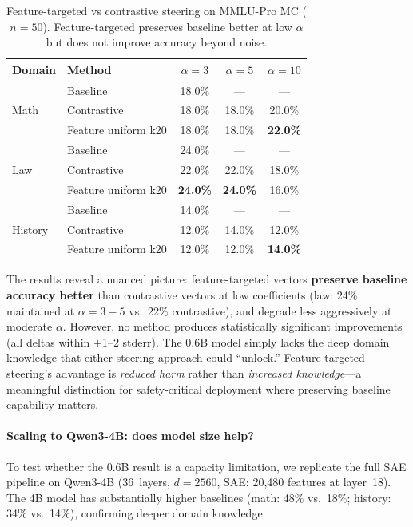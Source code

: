 \documentclass[11pt,a4paper]{article}
\begin{document}
\begin{table}[H]
\centering
\caption{Feature-targeted vs contrastive steering on MMLU-Pro MC ($n=50$). Feature-targeted preserves baseline better at low $\alpha$ but does not improve accuracy beyond noise.}
\label{tab:feature_targeted}
\small
\begin{tabular}{llccc}
\toprule
\textbf{Domain} & \textbf{Method} & $\alpha=3$ & $\alpha=5$ & $\alpha=10$ \\
\midrule
\multirow{3}{*}{Math}
  & Baseline          & 18.0\% & --- & --- \\
  & Contrastive       & 18.0\% & 18.0\% & 20.0\% \\
  & Feature uniform k20 & 18.0\% & 18.0\% & \textbf{22.0\%} \\
\midrule
\multirow{3}{*}{Law}
  & Baseline          & 24.0\% & --- & --- \\
  & Contrastive       & 22.0\% & 22.0\% & 18.0\% \\
  & Feature uniform k20 & \textbf{24.0\%} & \textbf{24.0\%} & 16.0\% \\
\midrule
\multirow{3}{*}{History}
  & Baseline          & 14.0\% & --- & --- \\
  & Contrastive       & 12.0\% & 14.0\% & 12.0\% \\
  & Feature uniform k20 & 12.0\% & 12.0\% & \textbf{14.0\%} \\
\bottomrule
\end{tabular}
\end{table}

The results reveal a nuanced picture: feature-targeted vectors \textbf{preserve baseline accuracy better} than contrastive vectors at low coefficients (law: 24\% maintained at $\alpha=3{-}5$ vs.\ 22\% contrastive), and degrade less aggressively at moderate $\alpha$. However, no method produces statistically significant improvements (all deltas within $\pm$1--2 stderr). The 0.6B model simply lacks the deep domain knowledge that either steering approach could ``unlock.'' Feature-targeted steering's advantage is \textit{reduced harm} rather than \textit{increased knowledge}---a meaningful distinction for safety-critical deployment where preserving baseline capability matters.

\paragraph{Scaling to Qwen3-4B: does model size help?}
To test whether the 0.6B result is a capacity limitation, we replicate the full SAE pipeline on Qwen3-4B (36~layers, $d=2560$, SAE: 20{,}480 features at layer~18). The 4B model has substantially higher baselines (math: 48\% vs.\ 18\%; history: 34\% vs.\ 14\%), confirming deeper domain knowledge.
\end{document}

